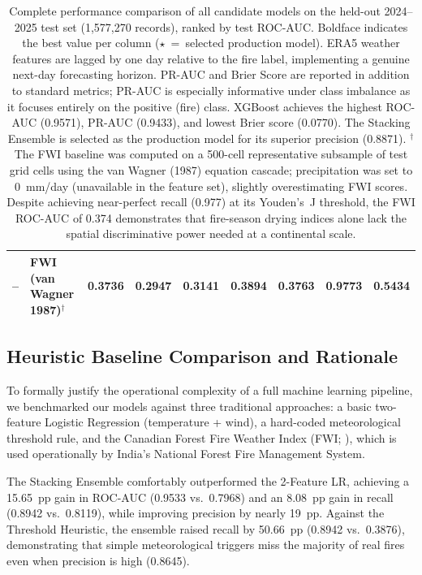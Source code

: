 \begin{table}[H]
{\begin{tabular}{clccccccc}
        -- & FWI (van Wagner 1987)$^\dagger$   & 0.3736          & 0.2947          & 0.3141          & 0.3894 & 0.3763          & 0.9773          & 0.5434 \\
        \bottomrule
    \end{tabular}%
    }
    \caption{Complete performance comparison of all candidate models on the held-out 2024--2025 test set (1,577,270 records), ranked by test ROC-AUC. Boldface indicates the best value per column ($\star$~=~selected production model). ERA5 weather features are lagged by one day relative to the fire label, implementing a genuine next-day forecasting horizon. PR-AUC and Brier Score are reported in addition to standard metrics; PR-AUC is especially informative under class imbalance as it focuses entirely on the positive (fire) class. XGBoost achieves the highest ROC-AUC (0.9571), PR-AUC (0.9433), and lowest Brier score (0.0770). The Stacking Ensemble is selected as the production model for its superior precision (0.8871). $^\dagger$The FWI baseline was computed on a 500-cell representative subsample of test grid cells using the van Wagner (1987) equation cascade; precipitation was set to 0~mm/day (unavailable in the feature set), slightly overestimating FWI scores. Despite achieving near-perfect recall (0.977) at its Youden's~J threshold, the FWI ROC-AUC of 0.374 demonstrates that fire-season drying indices alone lack the spatial discriminative power needed at a continental scale.}
\label{tab:model_results}
\end{table}

\subsection{Heuristic Baseline Comparison and Rationale}

To formally justify the operational complexity of a full machine learning pipeline, we benchmarked our models against three traditional approaches: a basic two-feature Logistic Regression (temperature + wind), a hard-coded meteorological threshold rule, and the Canadian Forest Fire Weather Index (FWI; \citealt{vanWagner1987}), which is used operationally by India's National Forest Fire Management System.

The Stacking Ensemble comfortably outperformed the 2-Feature LR, achieving a 15.65~pp gain in ROC-AUC (0.9533 vs.\ 0.7968) and an 8.08~pp gain in recall (0.8942 vs.\ 0.8119), while improving precision by nearly 19~pp. Against the Threshold Heuristic, the ensemble raised recall by 50.66~pp (0.8942 vs.\ 0.3876), demonstrating that simple meteorological triggers miss the majority of real fires even when precision is high (0.8645).

